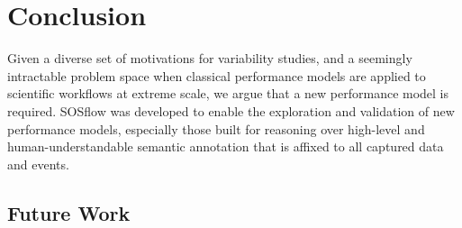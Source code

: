 
\section{Conclusion}

Given a diverse set of motivations for variability studies, and a
seemingly intractable problem space when classical performance models
are applied to scientific workflows at extreme scale, we argue that a
new performance model is required.
%
SOSflow was developed to enable the exploration and validation of new
performance models, especially those built for reasoning over
high-level and human-understandable semantic annotation that is
affixed to all captured data and events.
%



\subsection{Future Work}


